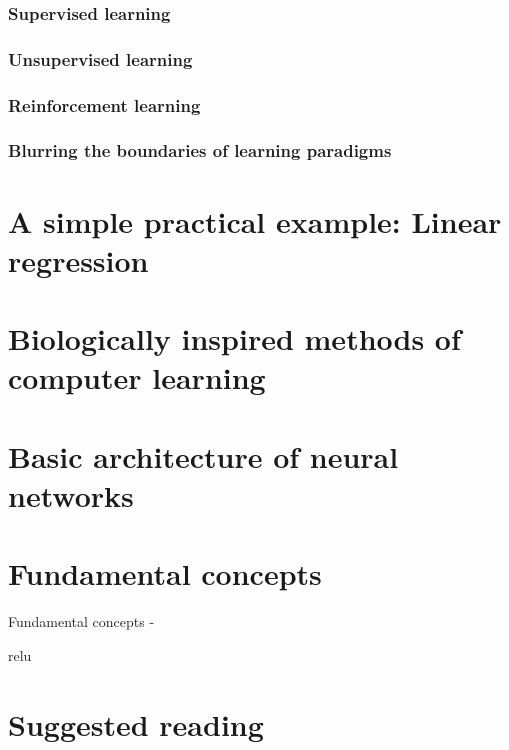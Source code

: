 \subsubsection{Supervised learning}

\subsubsection{Unsupervised learning}

\subsubsection{Reinforcement learning}

\subsubsection{Blurring the boundaries of learning paradigms}


\section{A simple practical example: Linear regression}


\section{Biologically inspired methods of computer learning}

\section{Basic architecture of neural networks}

\section{Fundamental concepts}
\begin{frame}[t,allowframebreaks]{Fundamental concepts - }

    \gls{relu}
\end{frame}






\section{Suggested reading}




